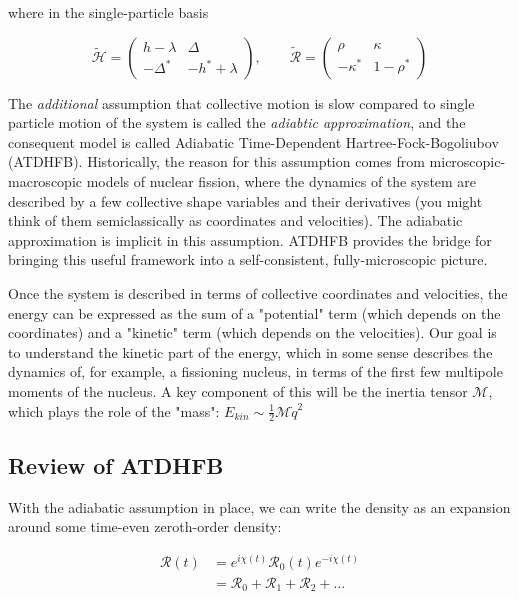 \noindent where in the single-particle basis

\begin{equation*}
\mathcal{\tilde{H}} = 
\left(\begin{array}{cc}
h-\lambda & \Delta \\
-\Delta^* & -h^*+\lambda
\end{array}\right), 
\qquad \mathcal{\tilde{R}} = 
\left(\begin{array}{cc}
\rho & \kappa \\
-\kappa^* & 1-\rho^*
\end{array}\right)
\end{equation*}

The \textit{additional} assumption that collective motion is slow compared to single particle motion of the system is called the \textit{adiabtic approximation}, and the consequent model is called Adiabatic Time-Dependent Hartree-Fock-Bogoliubov (ATDHFB). Historically, the reason for this assumption comes from microscopic-macroscopic models of nuclear fission, where the dynamics of the system are described by a few collective shape variables and their derivatives (you might think of them semiclassically as coordinates and velocities). The adiabatic approximation is implicit in this assumption. ATDHFB provides the bridge for bringing this useful framework into a self-consistent, fully-microscopic picture.

Once the system is described in terms of collective coordinates and velocities, the energy can be expressed as the sum of a "potential" term (which depends on the coordinates) and a "kinetic" term (which depends on the velocities). Our goal is to understand the kinetic part of the energy, which in some sense describes the dynamics of, for example, a fissioning nucleus, in terms of the first few multipole moments of the nucleus. A key component of this will be the inertia tensor $\mathcal{M}$, which plays the role of the "mass": $E_{kin}\sim\frac{1}{2}\mathcal{M}\dot{q}^2$

\subsection{Review of ATDHFB}

With the adiabatic assumption in place, we can write the density as an expansion around some time-even zeroth-order density:

\begin{align*}
\mathcal{R}(t) &= e^{i\chi(t)}\mathcal{R}_0(t)e^{-i\chi(t)} \\
&= \mathcal{R}_0 + \mathcal{R}_1 + \mathcal{R}_2 + \dots
\end{align*}

